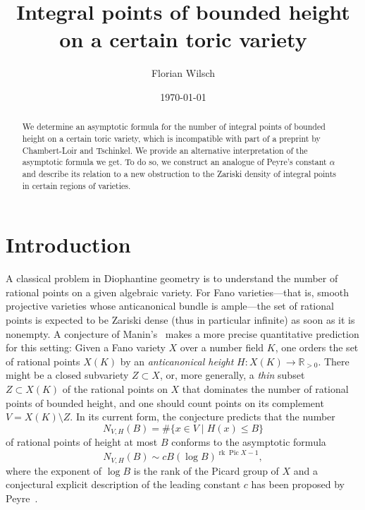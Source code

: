 \documentclass[a4paper, twoside, 10pt]{amsart}
\newcommand{\RR}{\mathbb{R}}
\DeclareMathOperator{\Pic}{Pic}
\DeclareMathOperator{\rk}{rk}
\theoremstyle{definition}
\begin{document}
\title[Integral points of bounded height on a certain toric variety]{Integral points of bounded height\\on a certain toric variety}
\author{Florian Wilsch}
\address{Institute of Science and Technology Austria, Am Campus 1,
  3400 Klosterneuburg, Austria}
\date{\today}

\begin{abstract}
  We determine an asymptotic formula for the number of integral points of bounded height on a certain toric variety, which is incompatible with part of a preprint by Chambert-Loir and Tschinkel.
  We provide an alternative interpretation of the asymptotic formula we get.
  To do so, we construct an analogue of Peyre's constant $\alpha$ and describe its relation to a new obstruction to the Zariski density of integral points in certain regions of varieties. 
\end{abstract}

\maketitle

\tableofcontents

\section{Introduction}

A classical problem in Diophantine geometry is to understand the number of rational points on a given algebraic variety. For Fano varieties---that is, smooth projective varieties whose anticanonical bundle is ample---the set of rational points is expected to be Zariski dense (thus in particular infinite) as soon as it is nonempty. 
A conjecture of Manin's~\cite{MR974910} makes a more precise quantitative prediction for this setting:
Given a Fano variety $X$ over a number field $K$, one orders the set of rational points $X(K)$ by an \emph{anticanonical height} $H\colon X(K)\to \RR_{>0}$. There might be a closed subvariety $Z\subset X$, or, more generally, a \emph{thin} 
subset $Z\subset X(K)$ of the rational points on $X$ that dominates the number of rational points of bounded height, and one should count points on its complement $V = X(K)\setminus Z$. 
In its current form, the conjecture predicts that the number
\[
  N_{V,H}(B) = \# \{ x \in V \mid  H(x) \le B\}
\]
of rational points of height at most $B$ conforms to the asymptotic formula
\begin{equation}\label{eq:Manin-Peyre}
  N_{V,H}(B) \sim c B (\log B)^{\rk\Pic X-1},
\end{equation}
where the exponent of $\log B$ is the rank of the Picard group of $X$ and a conjectural explicit description of the leading constant $c$ has been proposed by Peyre~\cite{MR2019019}.
\end{document}
